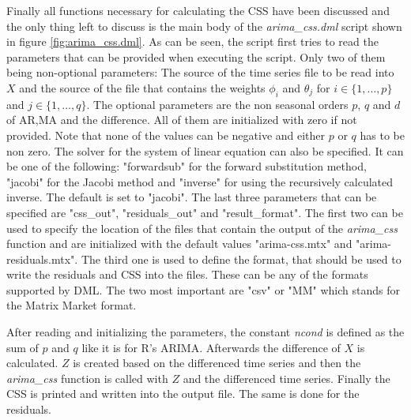 Finally all functions necessary for calculating the \acl{CSS} have been discussed and the only thing left to discuss is the main body of the \textit{arima\_css.dml} script shown in figure \ref{fig:arima_css.dml}. As can be seen, the script first tries to read the parameters that can be provided when executing the script. Only two of them being non-optional parameters: The source of the time series file to be read into $X$ and the source of the file that contains the weights $\phi_i$ and $\theta_j$ for $i \in \{1, \dots, p\}$ and $j \in \{1, \dots, q\}$. The optional parameters are the non seasonal orders $p$, $q$ and $d$ of \acs{AR},\acs{MA} and the difference. All of them are initialized with zero if not provided. Note that none of the values can be negative and either $p$ or $q$ has to be non zero. The solver for the system of linear equation can also be specified. It can be one of the following: "forwardsub" for the forward substitution method, "jacobi" for the Jacobi method and "inverse" for using the recursively calculated inverse. The default is set to "jacobi". The last three parameters that can be specified are "css\_out", "residuals\_out" and "result\_format". The first two can be used to specify the location of the files that contain the output of the \textit{arima\_css} function and are initialized with the default values "arima-css.mtx" and "arima-residuals.mtx". The third one is used to define the format, that should be used to write the residuals and \acl{CSS} into the files. These can be any of the formats supported by \acs{DML}. The two most important are "csv" or "MM" which stands for the Matrix Market format.

After reading and initializing the parameters, the constant \textit{ncond} is defined as the sum of $p$ and $q$ like it is for R's \acs{ARIMA}. Afterwards the difference of $X$ is calculated. $Z$ is created based on the differenced time series and then the \textit{arima\_css} function is called with $Z$ and the differenced time series. Finally the \acl{CSS} is printed and written into the output file. The same is done for the residuals.


